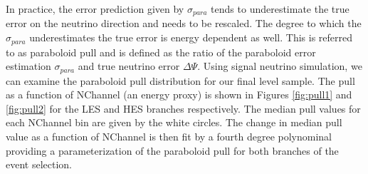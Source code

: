 \documentclass{gatech-thesis}
\begin{document}
In practice, the error prediction given by $\sigma_{para}$ tends to underestimate the true error on the neutrino direction and needs to be rescaled. The degree to which the $\sigma_{para}$ underestimates the true error is energy dependent as well. This is referred to as paraboloid pull and is defined as the ratio of the paraboloid error estimation $\sigma_{para}$ and true neutrino error $\Delta\Psi$. Using signal neutrino simulation, we can examine the paraboloid pull distribution for our final level sample. The pull as a function of NChannel (an energy proxy) is shown in Figures \ref{fig:pull1} and \ref{fig:pull2} for the LES and HES branches respectively. The median pull values for each NChannel bin are given by the white circles. The change in median pull value as a function of NChannel is then fit by a fourth degree polynominal providing a parameterization of the paraboloid pull for both branches of the event selection.
\end{document}
